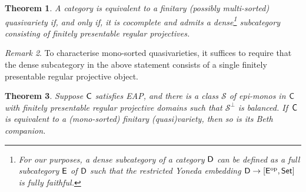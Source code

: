 \documentclass[a4paper,10pt,reqno]{amsart}
\newtheorem{theorem}{Theorem}[section]
\theoremstyle{definition}
\theoremstyle{remark}
\newtheorem{remark}[theorem]{Remark}
\newcommand{\cat}{{\sf C}}								%
\newcommand{\catt}{{\sf D}}								%
\newcommand{\Set}{{\sf Set}}								%
\newcommand{\ar}[1]{\mathcal{#1}}							%
\newcommand{\op}{{\mathrm{op}}}						%
\newcommand{\ort}[1]{{#1}^{\perp}}						%
\newcommand{\EAP}{\textnormal{EAP}}
\begin{document}
\begin{theorem}\label{t:characterisation-quasi-varieties}
A category is equivalent to a finitary (possibly multi-sorted) quasivariety if, and only if, it is cocomplete and admits a dense\footnote{For our purposes, a dense subcategory of a category $\catt$ can be defined as a full subcategory $\sf E$ of $\catt$ such that the restricted Yoneda embedding $\catt \to [\sf{E}^{\op},\Set]$ is fully faithful.} subcategory consisting of finitely presentable regular projectives. 
\end{theorem}

\begin{remark}
To characterise mono-sorted quasivarieties, it suffices to require that the dense subcategory in the above statement consists of a single finitely presentable regular projective object. 
\end{remark}

\begin{theorem}\label{t:transfer-quasi-variety}
Suppose $\cat$ satisfies \EAP, and there is a class $\ar{S}$ of epi-monos in $\cat$ with finitely presentable regular projective domains such that $\ort{\ar{S}}$ is balanced. If~$\cat$ is equivalent to a (mono-sorted) finitary (quasi)variety, then so is its Beth companion.
\end{theorem}
\end{document}
